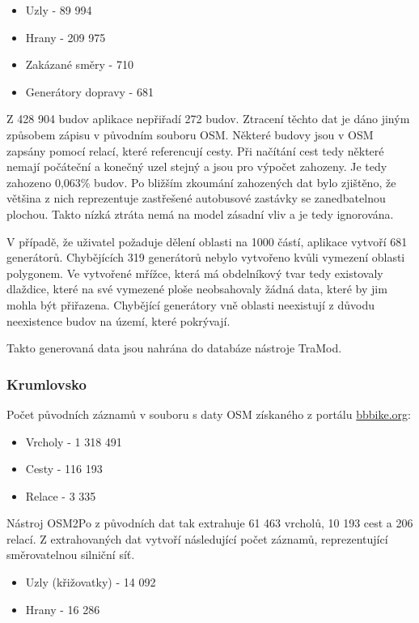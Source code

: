\begin{itemize}
	\item Uzly - 89 994
	\item Hrany - 209 975
	\item Zakázané směry - 710
	\item Generátory dopravy - 681 
\end{itemize}

Z 428 904 budov aplikace nepřiřadí 272 budov. Ztracení těchto dat je dáno jiným způsobem zápisu v původním souboru OSM. Některé budovy jsou v OSM zapsány pomocí relací, které referencují cesty. Při načítání cest tedy některé nemají počáteční a konečný uzel stejný a jsou pro výpočet zahozeny. Je tedy zahozeno 0,063\% budov. Po bližším zkoumání zahozených dat bylo zjištěno, že většina z nich reprezentuje zastřešené autobusové zastávky se zanedbatelnou plochou. Takto nízká ztráta nemá na model zásadní vliv a je tedy ignorována. 

V případě, že uživatel požaduje dělení oblasti na 1000 částí, aplikace vytvoří 681 generátorů. Chybějících 319 generátorů nebylo vytvořeno kvůli vymezení oblasti polygonem. Ve vytvořené mřížce, která má obdelníkový tvar tedy existovaly dlaždice, které na své vymezené ploše neobsahovaly žádná data, které by jim mohla být přiřazena. Chybějící generátory vně oblasti neexistují z důvodu neexistence budov na území, které pokrývají.

Takto generovaná data jsou nahrána do databáze nástroje TraMod. 


\subsubsection{Krumlovsko}

Počet původních záznamů v souboru s daty OSM získaného z portálu \url{bbbike.org}:

\begin{itemize}
	\item Vrcholy - 1 318 491
	\item Cesty - 116 193
	\item Relace - 3 335
\end{itemize}

Nástroj OSM2Po z původních dat tak extrahuje 61 463 vrcholů, 10 193 cest a 206 relací. Z extrahovaných dat vytvoří následující počet záznamů, reprezentující směrovatelnou silniční síť.

\begin{itemize}
	\item Uzly (křižovatky) - 14 092
	\item Hrany - 16 286
\end{itemize}

